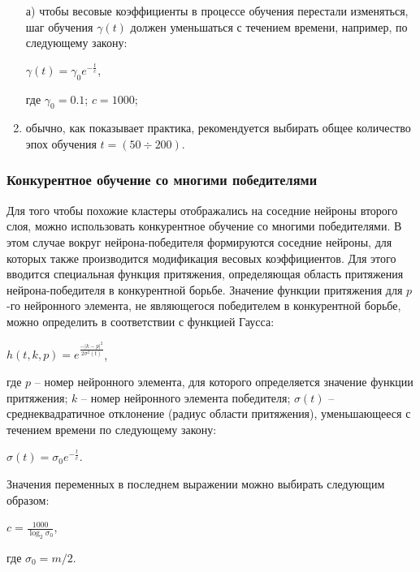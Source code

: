 \documentclass[bachelor, och, referat]{template}
\begin{document}
\begin{enumerate}
    \item[а)] чтобы весовые коэффициенты в процессе обучения перестали
    изменяться, шаг обучения $\gamma(t)$ должен уменьшаться с течением времени, 
    например, по следующему закону:

    \begin{center}
        $\gamma(t) = \gamma_0 e^{-\frac{t}{c}}$,
    \end{center}
    где $\gamma_0 = 0.1$; $c = 1000$;
    \item обычно, как показывает практика, рекомендуется выбирать 
    общее количество эпох обучения $t = (50 \div 200)$.
\end{enumerate}

\subsubsection{Конкурентное обучение со многими победителями}

Для того чтобы похожие кластеры отображались на соседние нейроны 
второго слоя, можно использовать конкурентное обучение со многими 
победителями. В этом случае вокруг нейрона-победителя формируются 
соседние нейроны, для которых также производится модификация
весовых коэффициентов. Для этого вводится специальная функция притяжения, 
определяющая область притяжения нейрона-победителя в конкурентной борьбе. 
Значение функции притяжения для $p$-го нейронного
элемента, не являющегося победителем в конкурентной борьбе, можно
определить в соответствии с функцией Гаусса:

\begin{center}
    $h(t, k, p) = e^{\frac{-|k - p|^2}{2\sigma^2(t)}}$,
\end{center}

где $p$ -- номер нейронного элемента, для которого определяется 
значение функции притяжения; $k$ -- номер нейронного элемента 
победителя; $\sigma(t)$ -- среднеквадратичное отклонение (радиус 
области притяжения), уменьшающееся с течением времени по следующему закону:

\begin{center}
    $\sigma(t) = \sigma_0 e^{-\frac{t}{c}}$.
\end{center}

Значения переменных в последнем выражении можно выбирать следующим образом:

\begin{center}
    $c = \frac{1000}{\log_2{\sigma_0}}$,
\end{center}
где $\sigma_0 = m / 2$.
\end{document}
